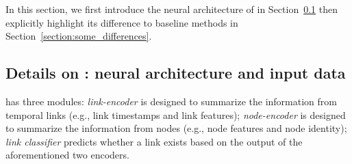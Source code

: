 In this section, we first introduce the neural architecture of \our in Section~\ref{section:method_details} then explicitly highlight its difference to baseline methods in Section~\ref{section:some_differences}.

\subsection{Details on \oure: neural architecture and input data} \label{section:method_details}

\our has three modules:  \emph{link-encoder} is designed to summarize the information from temporal links (e.g., link timestamps and link features);  \emph{node-encoder} is designed to summarize the information from nodes (e.g., node features and node identity);  \emph{link classifier} predicts whether a link exists based on the output of the aforementioned two encoders.

